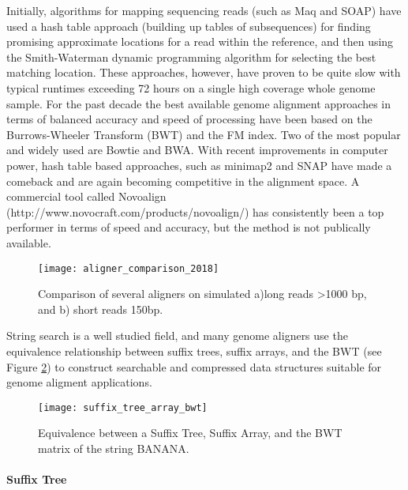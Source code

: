 Initially, algorithms for mapping sequencing reads (such as Maq\autocite{li2008mapping} and SOAP\autocite{li2008soap}) have used a hash table approach\autocite{reinert2015alignment} (building up tables of subsequences) for finding promising approximate locations for a read within the reference, and then using the Smith-Waterman\autocite{smith1981comparison} dynamic programming algorithm for selecting the best matching location. These approaches, however, have proven to be quite slow with typical runtimes exceeding 72 hours on a single high coverage whole genome sample. For the past decade the best available genome alignment approaches in terms of balanced accuracy and speed of processing have been based on the Burrows-Wheeler Transform (BWT)\autocite{burrows1994block} and the FM index\autocite{ferragina2000opportunistic}. Two of the most popular and widely used are Bowtie\autocite{langmead2009ultrafast} and BWA\autocite{li2009fast}. With recent improvements in computer power, hash table based approaches, such as minimap2\autocite{li2018minimap2} and SNAP\autocite{zaharia2011faster} have made a comeback and are again becoming competitive in the alignment space. A commercial tool called Novoalign (http://www.novocraft.com/products/novoalign/) has consistently been a top performer in terms of speed and accuracy, but the method is not publically available.

\begin{figure}[H]
    \texttt{[image: aligner\_comparison\_2018]}
    \centering
    \caption {Comparison of several aligners on simulated a)long reads >1000 bp, and b) short reads 150bp.\autocite{li2018minimap2}}
    \label{fig:aligner_comparison_2018}
\end{figure}

String search is a well studied field, and many genome aligners use the equivalence relationship between suffix trees, suffix arrays, and the BWT (see Figure \ref{fig:suffix_tree_array_bwt}) to construct searchable and compressed data structures suitable for genome aligment applications.

\begin{figure}[H]
    \texttt{[image: suffix\_tree\_array\_bwt]}
    \centering
    \caption {Equivalence between a Suffix Tree, Suffix Array, and the BWT matrix of the string BANANA.\autocite{langmead_teaching}}
    \label{fig:suffix_tree_array_bwt}
\end{figure}

\paragraph{Suffix Tree}


